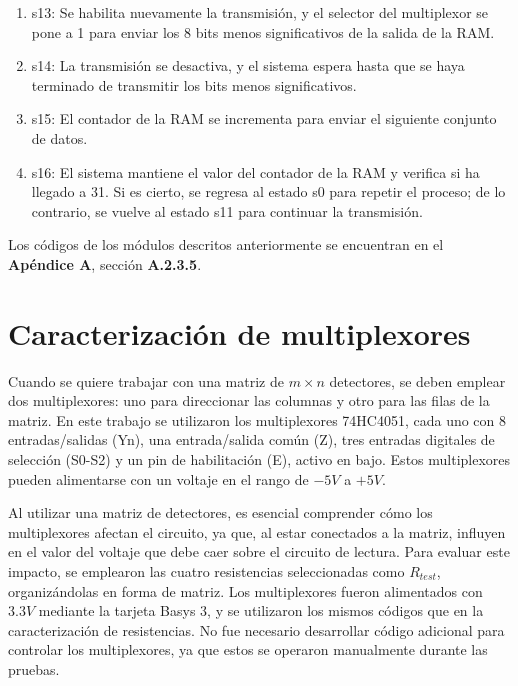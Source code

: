 \begin{itemize}
\begin{enumerate}
     \item s13: Se habilita nuevamente la transmisión, y el selector del multiplexor se pone a 1 para enviar los 8 bits menos significativos de la salida de la RAM.
     \item s14: La transmisión se desactiva, y el sistema espera hasta que se haya terminado de transmitir los bits menos significativos.
     \item s15: El contador de la RAM se incrementa para enviar el siguiente conjunto de datos.
     \item s16: El sistema mantiene el valor del contador de la RAM y verifica si ha llegado a 31. Si es cierto, se regresa al estado s0 para repetir el proceso; de lo contrario, se vuelve al estado s11 para continuar la transmisión.           
    \end{enumerate}
\end{itemize}

Los códigos de los módulos descritos anteriormente se encuentran en el \textbf{Apéndice A}, sección \textbf{A.2.3.5}.


\section{Caracterización de multiplexores}
Cuando se quiere trabajar con una matriz de $m \times n$ detectores, se deben emplear dos multiplexores: uno para direccionar las columnas y otro para las filas de la matriz. En este trabajo se utilizaron los multiplexores 74HC4051, cada uno con 8 entradas/salidas (Yn), una entrada/salida común (Z), tres entradas digitales de selección (S0-S2) y un pin de habilitación (E), activo en bajo. Estos multiplexores pueden alimentarse con un voltaje en el rango de $-5V$ a $+5V$.


Al utilizar una matriz de detectores, es esencial comprender cómo los multiplexores afectan el circuito, ya que, al estar conectados a la matriz, influyen en el valor del voltaje que debe caer sobre el circuito de lectura. Para evaluar este impacto, se emplearon las cuatro resistencias seleccionadas como $R_{test}$, organizándolas en forma de matriz. Los multiplexores fueron alimentados con $3.3V$ mediante la tarjeta Basys 3, y se utilizaron los mismos códigos que en la caracterización de resistencias. No fue necesario desarrollar código adicional para controlar los multiplexores, ya que estos se operaron manualmente durante las pruebas.


